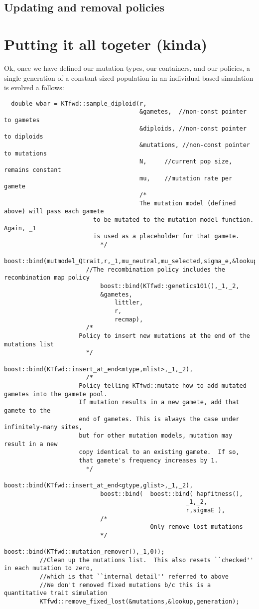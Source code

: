 \documentclass{article}
\begin{document}
\subsection{Updating and removal policies}

\section{Putting it all togeter (kinda)}
Ok, once we have defined our mutation types, our containers, and our policies, a single generation of a constant-sized population in an individual-based simulation is evolved a follows:
\begin{lstlisting}
  double wbar = KTfwd::sample_diploid(r,
                                      &gametes,  //non-const pointer to gametes
                                      &diploids, //non-const pointer to diploids
                                      &mutations, //non-const pointer to mutations
                                      N,     //current pop size, remains constant
                                      mu,    //mutation rate per gamete
                                      /*
                                      The mutation model (defined above) will pass each gamete
      					 to be mutated to the mutation model function.  Again, _1
      					 is used as a placeholder for that gamete.
      				       */
      				       boost::bind(mutmodel_Qtrait,r,_1,mu_neutral,mu_selected,sigma_e,&lookup),
				       //The recombination policy includes the recombination map policy
      				       boost::bind(KTfwd::genetics101(),_1,_2,
						   &gametes,
      						   littler,
      						   r,
      						   recmap),
				       /*
					 Policy to insert new mutations at the end of the mutations list
				       */
      				       boost::bind(KTfwd::insert_at_end<mtype,mlist>,_1,_2),
				       /*
					 Policy telling KTfwd::mutate how to add mutated gametes into the gamete pool.
					 If mutation results in a new gamete, add that gamete to the 
					 end of gametes. This is always the case under infinitely-many sites,
					 but for other mutation models, mutation may result in a new
					 copy identical to an existing gamete.  If so,
					 that gamete's frequency increases by 1.
				       */
      				       boost::bind(KTfwd::insert_at_end<gtype,glist>,_1,_2),
      				       boost::bind(  boost::bind( hapfitness(),
                                                   _1,_2,
                                                   r,sigmaE ),
      				       /*
                                         Only remove lost mutations
      				       */
      				       boost::bind(KTfwd::mutation_remover(),_1,0));
          //Clean up the mutations list.  This also resets ``checked'' in each mutation to zero,
          //which is that ``internal detail'' referred to above
          //We don't removed fixed mutations b/c this is a quantitative trait simulation
      	  KTfwd::remove_fixed_lost(&mutations,&lookup,generation);
\end{lstlisting}
\end{document}
